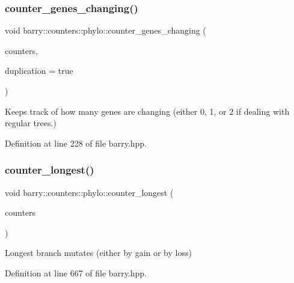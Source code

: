 \subsubsection{\texorpdfstring{counter\+\_\+genes\+\_\+changing()}{counter\_genes\_changing()}}
{\footnotesize\ttfamily void barry\+::counters\+::phylo\+::counter\+\_\+genes\+\_\+changing (\begin{DoxyParamCaption}\item[{\hyperlink{namespacebarry_1_1counters_1_1phylo_a4e401ffe66d04091343dcffaf915f8c3}{Phylo\+Counters} $\ast$}]{counters,  }\item[{bool}]{duplication = {\ttfamily true} }\end{DoxyParamCaption})\hspace{0.3cm}{\ttfamily [inline]}}



Keeps track of how many genes are changing (either 0, 1, or 2 if dealing with regular trees.) 



Definition at line 228 of file barry.\+hpp.

\mbox{\label{namespacebarry_1_1counters_1_1phylo_ae4ace7c30011a6d7047a94fd0ddf2df2}} 
\subsubsection{\texorpdfstring{counter\+\_\+longest()}{counter\_longest()}}
{\footnotesize\ttfamily void barry\+::counters\+::phylo\+::counter\+\_\+longest (\begin{DoxyParamCaption}\item[{\hyperlink{namespacebarry_1_1counters_1_1phylo_a4e401ffe66d04091343dcffaf915f8c3}{Phylo\+Counters} $\ast$}]{counters }\end{DoxyParamCaption})\hspace{0.3cm}{\ttfamily [inline]}}



Longest branch mutates (either by gain or by loss) 



Definition at line 667 of file barry.\+hpp.

\mbox{\label{namespacebarry_1_1counters_1_1phylo_affbd49d13928ece0a2f100261375d2a7}} 
